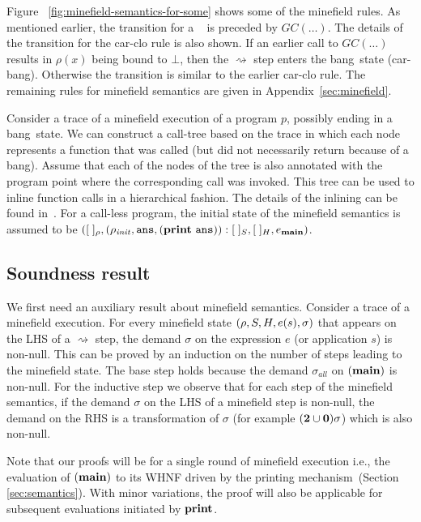 \documentclass[9pt,preprint,nonatbib]{sigplanconf}
\newcommand{\bang}{\mbox{\sc bang}}
\begin{document}
Figure ~\ref{fig:minefield-semantics-for-some} shows some of the
minefield rules. As mentioned earlier, the transition for a \LET\ 
is preceded  by $GC(\ldots)$.  The details of the transition for the {\sc
  car-clo}  rule   is  also shown.  If    an
earlier  call to  $GC(\ldots)$  results  in $\rho(x)$  being
bound  to  $\bot$,  then  the  $\rightsquigarrow$  step
enters the  \bang\ state ({\sc  car-bang}). Otherwise
the transition is similar to the earlier {\sc car-clo}
rule. The remaining rules for minefield semantics are given in Appendix~\ref{sec:minefield}.



Consider a trace  of a minefield execution of a  program $p$, possibly
ending in  a \bang\ state. We  can construct a call-tree  based on the
trace in  which each node represents  a function that was  called (but
did not necessarily  return because of a \bang).  Assume  that each of
the nodes of  the tree is also annotated with  the program point where
the corresponding call  was invoked.  This tree can be  used to inline
function calls in a hierarchical fashion.  The details of the inlining
can be found in~\cite{asati14lgc}.
For  a
call-less program,  the initial state of  the minefield
semantics  is  assumed  to  be  $([\;]_\rho,(\rho_\mathit{init},
\mathbf{\mbox{\tt ans}},      (\mathbf{print}~\mathbf{\mbox{\tt ans}})):[\;]_{S}     ,      [\;]_{H},
e_{\mathbf{main}})$.
   
 
\subsection{Soundness result}
We first need an auxiliary  result about minefield semantics. Consider
a trace of  a minefield execution.  For every  minefield state $(\rho,
S,   H,  e(s),   \sigma)$   that   appears  on   the   LHS  of   a
$\rightsquigarrow$ step, the demand $\sigma$ on the expression $e$ (or
application $s$) is  non-null.  This can be proved by  an induction on
the number  of steps leading  to the  minefield state.  The  base step
holds   because  the   demand   $\sigma_{\mathit{all}}$   on  $(\mathbf{main})$   is
non-null. For the inductive step we  observe that for each step of the
minefield semantics, if the demand $\sigma$  on the LHS of a minefield
step  is non-null,  the  demand  on the  RHS  is  a transformation  of
$\sigma$ (for example $({\mathbf{2}}\cup\mathbf{0})\sigma$) which is also non-null.

Note that our proofs will be for a single round of minefield execution
i.e.,  the evaluation of  $(\mathbf{main})$  to   its  WHNF  driven  by   the  printing  mechanism~(Section
\ref{sec:semantics}).  With  minor variations,  the proof will  also be
applicable for subsequent evaluations initiated by $\mathbf{print}$.
\end{document}
